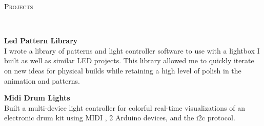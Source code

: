 \documentclass{article}
\newenvironment{changemargin}[2]{%
  \begin{list}{}{%
    \setlength{\topsep}{0pt}%
    \setlength{\leftmargin}{#1}%
    \setlength{\rightmargin}{#2}%
    \setlength{\listparindent}{\parindent}%
    \setlength{\itemindent}{\parindent}%
    \setlength{\parsep}{\parskip}%
  }%
  \item[]}{\end{list}
}
\newcommand{\lineover}{
	\begin{changemargin}{-0.05in}{-0.05in}
		\vspace*{-8pt}
		\hrulefill \\
		\vspace*{-2pt}
	\end{changemargin}
}
\newcommand{\header}[1]{
	\begin{changemargin}{-0.5in}{-0.5in}
		\scshape{#1}\\
  	\lineover
	\end{changemargin}
}
\newenvironment{body} {
	\vspace*{-16pt}
	\begin{changemargin}{-0.25in}{-0.5in}
  }	
	{\end{changemargin}
}
\begin{document}
\header{Projects}
\begin{body}
	\vspace{20pt}
	
	\vspace{8pt}
	\textbf{Led Pattern Library}\\
	I wrote a library of patterns and light controller software to use with a lightbox I built as well as similar LED projects. This library allowed me to quickly iterate on new ideas for physical builds while retaining a high level of polish in the animation and patterns.

	\vspace{8pt}
	\textbf{Midi Drum Lights}\\
	Built a multi-device light controller for colorful real-time visualizations of an electronic drum kit using MIDI , 2 Arduino devices, and the i2c protocol.
		
\end{body}
\end{document}
